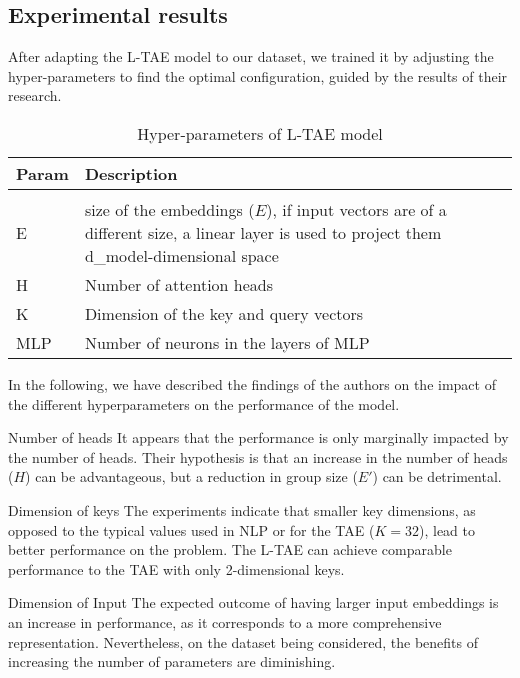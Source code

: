 \subsection{Experimental results}

After adapting the L-TAE model to our dataset, we trained it by adjusting the hyper-parameters to find the optimal configuration, guided by the results of their research.

\begin{table}[ht]
  \centering
  \begin{tabular}{l p{12cm}}   
     Param & Description \\[0.2cm] 
     \hline \\[-0.2cm]  
     E & size of the embeddings ($E$), if input vectors are of a different size, a linear layer is used to project them d\_model-dimensional space \\
     H & Number of attention heads  \\
     K & Dimension of the key and query vectors  \\
     MLP & Number of neurons in the layers of MLP \\
  \end{tabular}
  \caption{Hyper-parameters of L-TAE model}
  \label{tab:LTAEconfig}
\end{table}

In the following, we have described the findings of the authors on the impact of the different hyperparameters on the performance of the model.

\begin{paragraph} {Number of heads} 
It appears that the performance is only marginally impacted by the number of heads. 
Their hypothesis is that an increase in the number of heads ($H$) can be advantageous, but a reduction in group size ($E'$) can be detrimental.
\end{paragraph}

\begin{paragraph} {Dimension of keys}
The experiments indicate that smaller key dimensions, as opposed to the typical values used in NLP or for the TAE ($K = 32$), lead to better performance on the problem.
The L-TAE can achieve comparable performance to the TAE with only 2-dimensional keys.
\end{paragraph}

\begin{paragraph} {Dimension of Input}
The expected outcome of having larger input embeddings is an increase in performance, as it corresponds to a more comprehensive representation.
Nevertheless, on the dataset being considered, the benefits of increasing the number of parameters are diminishing.
\end{paragraph}

